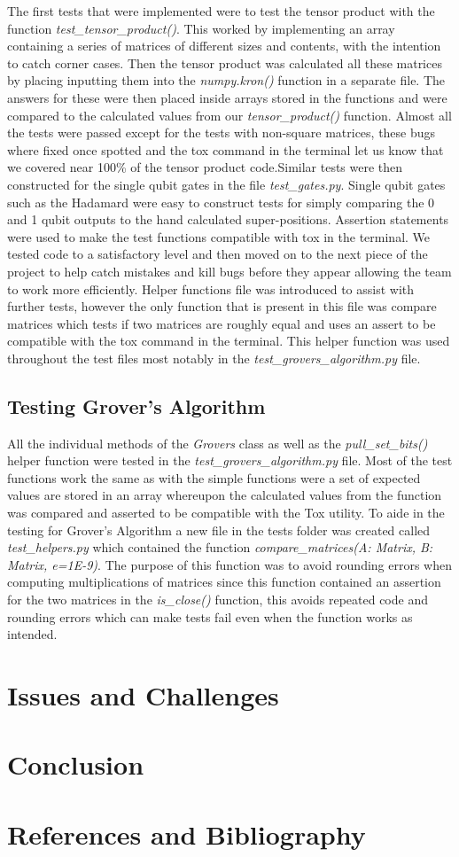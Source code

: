 \documentclass{article}
\begin{document}
 The first tests that were implemented were to test the tensor product with the function \textit{test\_tensor\_product()}. This worked by implementing an array containing a series of matrices of different sizes and contents, with the intention to catch corner cases. Then the tensor product was calculated all these matrices by placing inputting them into the \textit{numpy.kron()} function in a separate file. The answers for these were then placed inside arrays stored in the functions and were compared to the calculated values from our \textit{tensor\_product()} function. Almost all the tests were passed except for the tests with non-square matrices, these bugs where fixed once spotted and the tox command in the terminal let us know that we covered near 100\% of the tensor product code.Similar tests were then constructed for the single qubit gates in the file \textit{test\_gates.py}. Single qubit gates such as the Hadamard were easy to construct tests for simply comparing the 0 and 1 qubit outputs to the hand calculated super-positions. Assertion statements were used to make the test functions compatible with tox in the terminal. We tested code to a satisfactory level and then moved on to the next piece of the project to help catch mistakes and kill bugs before they appear allowing the team to work more efficiently. Helper functions file was introduced to assist with further tests, however the only function that is present in this file was compare matrices which tests if two matrices are roughly equal and uses an assert to be compatible with the tox command in the terminal.  This helper function was used throughout the test files most notably in the \textit{test\_grovers\_algorithm.py} file. 
\subsection{Testing Grover's Algorithm}

All the individual methods of the \textit{Grovers} class as well as the \textit{pull\_set\_bits()} helper function were tested in the \textit{test\_grovers\_algorithm.py} file. Most of the test functions work the same as with the simple functions were a set of expected values are stored in an array whereupon the calculated values from the function was compared and asserted to be compatible with the Tox utility. To aide in the testing for Grover's Algorithm a new file in the tests folder was created called  \textit{test\_helpers.py} which contained the function \textit{compare\_matrices(A: Matrix, B: Matrix, e=1E-9)}. The purpose of this function was to avoid rounding errors when computing multiplications of matrices since this function contained an assertion for the two matrices in the \textit{is\_close()} function, this avoids repeated code and rounding errors which can make tests fail even when the function works as intended.


\section{Issues and Challenges}

\section{Conclusion} %

\pagebreak
\section{References and Bibliography}
\printbibliography[heading=none]
\end{document}
